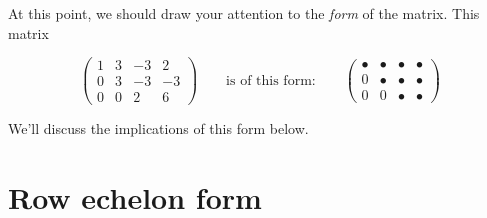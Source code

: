 \documentclass{ximera}
\begin{document}
At this point, we should draw your attention to the \emph{form} of the matrix. This matrix

\[
\begin{pmatrix}
  1 &   3 & -3 & 2  \\
  0 &   3 & -3 & -3 \\
  0& 0  & 2 & 6
\end{pmatrix}
\qquad
\text{is of this form:}
\qquad
\begin{pmatrix}
  \bullet & \bullet & \bullet & \bullet \\
     0   & \bullet & \bullet & \bullet \\
     0  &    0 & \bullet & \bullet
\end{pmatrix}
\]



We'll discuss the implications of this form below.


\section{Row echelon form}
\end{document}
